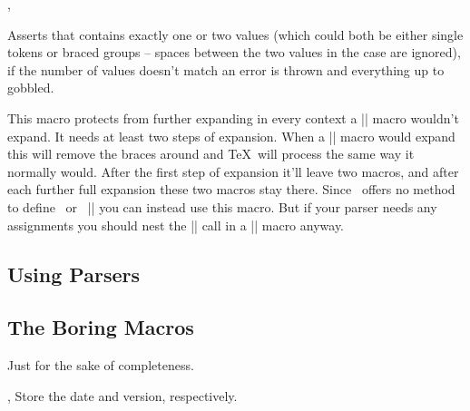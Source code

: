\begin{function}{\ekvpAssertOneValue,\ekvpAssertTwoValues}
  \begin{syntax}
  \end{syntax}
  Asserts that  contains exactly one or two values (which could both
  be either single tokens or braced groups -- spaces between the two values in
  the  case are ignored), if the number of values
  doesn't match an error is thrown and everything up to  gobbled.
\end{function}

\begin{function}{\ekvpProtect}
  \begin{syntax}
  \end{syntax}
  This macro protects  from further expanding in every context a
  |\protected| macro wouldn't expand. It needs at least two steps of expansion.
  When a |\protected| macro would expand this will remove the braces around
   and \TeX\ will process  the same way it normally would.
  After the first step of expansion it'll leave two macros, and after each
  further full expansion these two macros stay there. Since \expkvp\ offers no
  method to define \prefixes\ or \types\ |\protected| you can instead use this
  macro. But if your parser needs any assignments you should nest the
  |\ekvpParse| call in a |\protected| macro anyway.
\end{function}

\subsection{Using Parsers}


\subsection{The Boring Macros}
Just for the sake of completeness.
\begin{function}{\ekvpDate,\ekvpVersion}
  Store the date and version, respectively.
\end{function}

